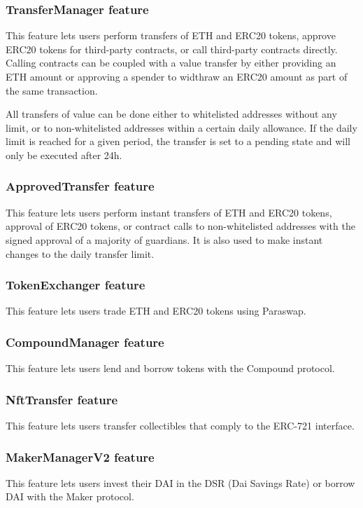 \documentclass[12pt]{article}
\begin{document}
\subsubsection{TransferManager feature}

This feature lets users perform transfers of ETH and ERC20 tokens, approve ERC20 tokens for third-party contracts, or call third-party contracts directly. Calling contracts can be coupled with a value transfer by either providing an ETH amount or approving a spender to widthraw an ERC20 amount as part of the same transaction.

All transfers of value can be done either to whitelisted addresses without any limit, or to non-whitelisted addresses within a certain daily allowance. If the daily limit is reached for a given period, the transfer is set to a pending state and will only be executed after 24h.

\subsubsection{ApprovedTransfer feature}

This feature lets users perform instant transfers of ETH and ERC20 tokens, approval of ERC20 tokens, or contract calls to non-whitelisted addresses with the signed approval of a majority of guardians. It is also used to make instant changes to the daily transfer limit.

\subsubsection{TokenExchanger feature}

This feature lets users trade ETH and ERC20 tokens using Paraswap.

\subsubsection{CompoundManager feature}

This feature lets users lend and borrow tokens with the Compound protocol. 

\subsubsection{NftTransfer feature}

This feature lets users transfer collectibles that comply to the ERC-721 interface.  

\subsubsection{MakerManagerV2 feature}

This feature lets users invest their DAI in the DSR (Dai Savings Rate) or borrow DAI with the Maker protocol. 
\end{document}

